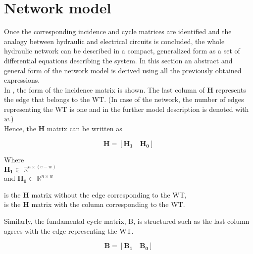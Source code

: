 \section{Network model}  
\label{ParameterEstimation}
Once the corresponding incidence and cycle matrices are identified and the analogy between hydraulic and electrical circuits is concluded, the whole hydraulic network can be described in a compact, generalized form as a set of differential equations describing the system. In this section an abstract and general form of the network model is derived using all the previously obtained expressions. 
\\
In , the form of the incidence matrix is shown. The last column of $\pmb{H}$ represents the edge that belongs to the WT. (In case of the network, the number of edges representing the WT is one and in the further model description is denoted with $w$.) 
\\
Hence, the $\pmb{H}$ matrix can be written as 

\begin {equation}
\pmb{H} = [\pmb{H_1} \quad \pmb{H_0}]
\label{Hmatrix}
\end{equation}

\begin{minipage}[t]{0.18\textwidth}
Where\\
\hspace*{8mm} $\pmb{H_1} \in \: \mathbb{R}^{n \times (e-w)}$  \\
and \hspace*{0.4mm} $\pmb{H_0} \in \: \mathbb{R}^{n \times w} $ 
\end{minipage}
\begin{minipage}[t]{0.70\textwidth}
\vspace*{2mm}
\hspace*{4mm} is the $\pmb{H}$ matrix without the edge corresponding to the WT,\\
\hspace*{4mm} is the $\pmb{H}$ matrix with the column corresponding to the WT. 
\end{minipage}

Similarly, the fundamental cycle matrix, B, is structured such as the last column agrees with the edge representing the WT.

\begin{equation}
  \pmb{B} = [\pmb{B_1} \quad \pmb{B_0}]
\end{equation} 

